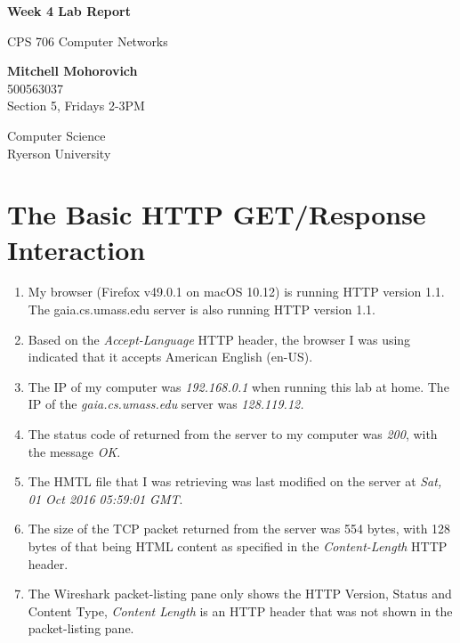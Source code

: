 \documentclass[12pt]{article}
\begin{document}
\begin{titlepage}
	\begin{center}
		\vspace*{1cm}

		\Huge
		\textbf{Week 4 Lab Report}

		\vspace{0.2cm}
		\LARGE
		CPS 706 Computer Networks

		\vspace{1.5cm}

		\textbf{Mitchell Mohorovich}\\
		\vspace{0.2cm}
		\Large
		500563037\\
		\Large
		Section 5, Fridays 2-3PM

		\vfill

		\vspace{0.8cm}

		\Large
		Computer Science\\
		Ryerson University\\
	\end{center}
\end{titlepage}


\section{The Basic HTTP GET/Response Interaction}
\begin{enumerate}
	\item{My browser (Firefox v49.0.1 on macOS 10.12) is running HTTP version 1.1. The gaia.cs.umass.edu server is also running HTTP version 1.1.}
	\item{Based on the \textit{Accept-Language} HTTP header, the browser I was using indicated that it accepts American English (en-US).}
	\item{The IP of my computer was \textit{192.168.0.1} when running this lab at home. The IP of the \textit{gaia.cs.umass.edu} server was \textit{128.119.12.}}
	\item{The status code of returned from the server to my computer was \textit{200}, with the message \textit{OK}.}
	\item{The HMTL file that I was retrieving was last modified on the server at \textit{Sat, 01 Oct 2016 05:59:01 GMT}.}
	\item{The size of the TCP packet returned from the server was 554 bytes, with 128 bytes of that being HTML content as specified in the \textit{Content-Length} HTTP header.}
	\item{The Wireshark packet-listing pane only shows the HTTP Version, Status and Content Type, \textit{Content Length} is an HTTP header that was not shown in the packet-listing pane.}
\end{enumerate}
\end{document}
